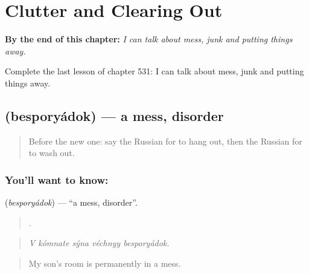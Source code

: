 
\chapter{Clutter and Clearing Out}
\label{ch:ru-clutter-and-clearing-out}

\begin{chapteropening}
\textbf{By the end of this chapter:} \emph{I can talk about mess, junk and putting things away.}

Complete the last lesson of chapter 531: I can talk about mess, junk and putting things away.
\end{chapteropening}

\section[\texorpdfstring{\ru{беспорядок} (besporyádok)}{беспорядок (besporyádok)}]{ (besporyádok) — a mess, disorder}

\label{lesson:RU-C531-besporyadok}



\begin{quote}
Before the new one: say the Russian for to hang out, then the Russian for to wash out.
\end{quote}

\subsection*{You'll want to know: }
\textbf{} (\emph{besporyádok}) — \textquotedblleft{}a mess, disorder\textquotedblright{}.

\begin{quote}
    .
\end{quote}

\begin{quote}
\emph{V kómnate sýna véchnyy besporyádok.}
\end{quote}

\begin{quote}
My son's room is permanently in a mess.
\end{quote}

